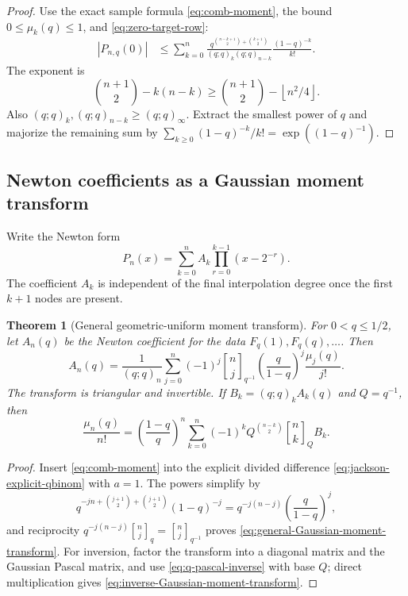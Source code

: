 \documentclass[11pt,a4paper,oneside]{article}
\newtheorem{theorem}{Theorem}[section]
\theoremstyle{definition}
\theoremstyle{remark}
\newcommand{\floor}[1]{\left\lfloor#1\right\rfloor}
\newcommand{\qbinom}[3]{\genfrac{[}{]}{0pt}{}{#1}{#2}_{#3}}
\begin{document}
\begin{proof}
Use the exact sample formula \eqref{eq:comb-moment}, the bound
$0\le\mu_k(q)\le1$, and \eqref{eq:zero-target-row}:
\begin{align*}
 |P_{n,q}(0)|
 &\le\sum_{k=0}^n
 \frac{q^{\binom{n-k+1}{2}+\binom{k+1}{2}}}
 {(q;q)_k(q;q)_{n-k}}
 \frac{(1-q)^{-k}}{k!}.
\end{align*}
The exponent is
\[
 \binom{n+1}{2}-k(n-k)
 \ge\binom{n+1}{2}-\floor{n^2/4}.
\]
Also $(q;q)_k,(q;q)_{n-k}\ge(q;q)_\infty$.  Extract the smallest power of
$q$ and majorize the remaining sum by
$\sum_{k\ge0}(1-q)^{-k}/k!=\exp((1-q)^{-1})$.
\end{proof}

\subsection{Newton coefficients as a Gaussian moment transform}

Write the Newton form
\begin{equation}
 P_n(x)=\sum_{k=0}^n A_k\prod_{r=0}^{k-1}(x-2^{-r}).
 \label{eq:fabius-newton-form}
\end{equation}
The coefficient $A_k$ is independent of the final interpolation degree once
the first $k+1$ nodes are present.

\begin{theorem}[General geometric-uniform moment transform]
\label{thm:general-moment-transform}
For $0<q\le1/2$, let $A_n(q)$ be the Newton coefficient for the data
$F_q(1),F_q(q),\ldots$.  Then
\begin{equation}
 A_n(q)=\frac1{(q;q)_n}
 \sum_{j=0}^n(-1)^j
 \qbinom nj{q^{-1}}
 \left(\frac q{1-q}\right)^j
 \frac{\mu_j(q)}{j!}.
 \label{eq:general-Gaussian-moment-transform}
\end{equation}
The transform is triangular and invertible.  If
$B_k=(q;q)_kA_k(q)$ and $Q=q^{-1}$, then
\begin{equation}
 \frac{\mu_n(q)}{n!}
 =\left(\frac{1-q}{q}\right)^n
 \sum_{k=0}^n(-1)^kQ^{\binom{n-k}{2}}
 \qbinom nkQ B_k.
 \label{eq:inverse-Gaussian-moment-transform}
\end{equation}
\end{theorem}

\begin{proof}
Insert \eqref{eq:comb-moment} into the explicit divided difference
\eqref{eq:jackson-explicit-qbinom} with $a=1$.  The powers simplify by
\[
 q^{-jn+\binom{j+1}{2}+\binom{j+1}{2}}(1-q)^{-j}
 =q^{-j(n-j)}\left(\frac q{1-q}\right)^j,
\]
and reciprocity
$q^{-j(n-j)}\qbinom njq=\qbinom nj{q^{-1}}$ proves
\eqref{eq:general-Gaussian-moment-transform}.
For inversion, factor the transform into a diagonal matrix and the Gaussian
Pascal matrix, and use \eqref{eq:q-pascal-inverse} with base $Q$; direct
multiplication gives \eqref{eq:inverse-Gaussian-moment-transform}.
\end{proof}
\end{document}
